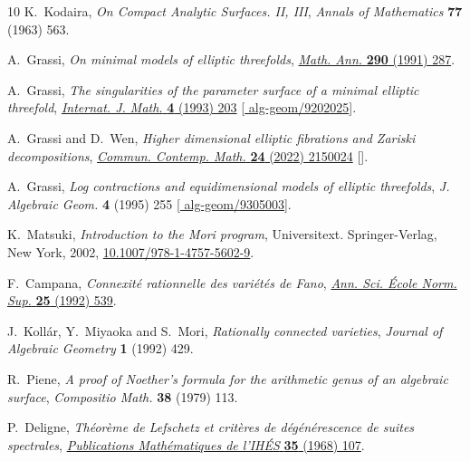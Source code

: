 \documentclass[11pt]{amsart}
\theoremstyle{definition}
\theoremstyle{definition}
\theoremstyle{remark}
\theoremstyle{remark}
\theoremstyle{definition}
\theoremstyle{conjecture}
\begin{document}
\begin{thebibliography}{10}
K.~Kodaira, \emph{On {C}ompact {A}nalytic {S}urfaces. {II}, {III}},
  {\emph{Annals of Mathematics} {\bfseries 77} (1963) 563}.

A.~Grassi, \emph{On minimal models of elliptic threefolds},
  \href{https://doi.org/10.1007/BF01459246}{\emph{Math. Ann.} {\bfseries 290}
  (1991) 287}.

A.~Grassi, \emph{The singularities of the parameter surface of a minimal
  elliptic threefold},
  \href{https://doi.org/10.1142/S0129167X93000121}{\emph{Internat. J. Math.}
  {\bfseries 4} (1993) 203}
  [\href{https://arxiv.org/abs/alg-geom/9202025}{{\ttfamily
  alg-geom/9202025}}].

A.~Grassi and D.~Wen, \emph{{Higher dimensional elliptic fibrations and
  {Z}ariski decompositions}},
  \href{https://doi.org/10.1142/S0219199721500243}{\emph{Commun. Contemp.
  Math.} {\bfseries 24} (2022) 2150024}
  [\href{https://arxiv.org/abs/1904.02779}{{}}].

A.~Grassi, \emph{Log contractions and equidimensional models of elliptic
  threefolds}, {\emph{J. Algebraic Geom.} {\bfseries 4} (1995) 255}
  [\href{https://arxiv.org/abs/alg-geom/9305003}{{\ttfamily
  alg-geom/9305003}}].

K.~Matsuki, \emph{Introduction to the {M}ori program}, Universitext.
  Springer-Verlag, New York, 2002,
  \href{https://doi.org/10.1007/978-1-4757-5602-9}{10.1007/978-1-4757-5602-9}.

F.~Campana, \emph{Connexit{\'e} rationnelle des vari{\'e}t{\'e}s de {F}ano},
  \href{https://doi.org/10.24033/asens.1658}{\emph{Ann. Sci. {\'E}cole Norm.
  Sup.} {\bfseries 25} (1992) 539}.

J.~Koll{\'a}r, Y.~Miyaoka and S.~Mori, \emph{Rationally connected varieties},
  {\emph{Journal of Algebraic Geometry} {\bfseries 1} (1992) 429}.

R.~Piene, \emph{A proof of {N}oether's formula for the arithmetic genus of an
  algebraic surface}, {\emph{Compositio Math.} {\bfseries 38} (1979) 113}.

P.~Deligne, \emph{Th\'eor\`eme de {L}efschetz et crit\`eres de
  d\'eg\'en\'erescence de suites spectrales},
  \href{https://doi.org/10.1007/BF02698925}{\emph{Publications Math\'ematiques
  de l'IH\'ES} {\bfseries 35} (1968) 107}.


\end{thebibliography}
\end{document}
